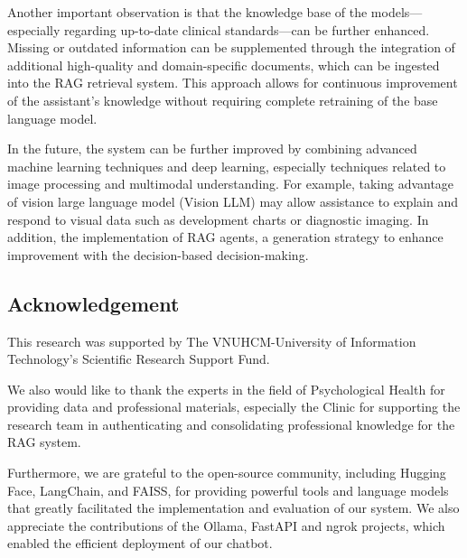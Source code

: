\documentclass[runningheads]{llncs}
\begin{document}
Another important observation is that the knowledge base of the models—especially regarding up-to-date clinical standards—can be further enhanced. Missing or outdated information can be supplemented through the integration of additional high-quality and domain-specific documents, which can be ingested into the RAG retrieval system. This approach allows for continuous improvement of the assistant's knowledge without requiring complete retraining of the base language model.

In the future, the system can be further improved by combining advanced machine learning techniques and deep learning, especially techniques related to image processing and multimodal understanding. For example, taking advantage of vision large language model (Vision LLM) may allow assistance to explain and respond to visual data such as development charts or diagnostic imaging. In addition, the implementation of RAG agents, a generation strategy to enhance improvement with the decision-based decision-making.

\subsection{Acknowledgement}

This research was supported by The VNUHCM-University of Information Technology’s Scientific Research Support Fund.

We also would like to thank the experts in the field of Psychological Health for providing data and professional materials, especially the Clinic for supporting the research team in authenticating and consolidating professional knowledge for the RAG system.

Furthermore, we are grateful to the open-source community, including Hugging Face, LangChain, and FAISS, for providing powerful tools and language models that greatly facilitated the implementation and evaluation of our system. We also appreciate the contributions of the Ollama, FastAPI and ngrok projects, which enabled the efficient deployment of our chatbot.
\end{document}
